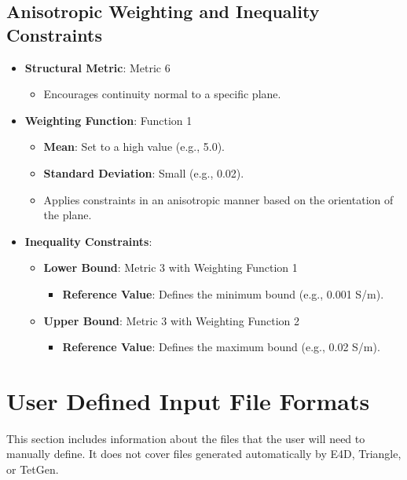 \documentclass[a4paper,12pt]{article}
\begin{document}
\subsection{Anisotropic Weighting and Inequality Constraints}
\begin{itemize}
    \item \textbf{Structural Metric}: Metric 6
    \begin{itemize}
        \item Encourages continuity normal to a specific plane.
    \end{itemize}
    \item \textbf{Weighting Function}: Function 1
    \begin{itemize}
        \item \textbf{Mean}: Set to a high value (e.g., 5.0).
        \item \textbf{Standard Deviation}: Small (e.g., 0.02).
        \item Applies constraints in an anisotropic manner based on the orientation of the plane.
    \end{itemize}
    \item \textbf{Inequality Constraints}:
    \begin{itemize}
        \item \textbf{Lower Bound}: Metric 3 with Weighting Function 1
        \begin{itemize}
            \item \textbf{Reference Value}: Defines the minimum bound (e.g., 0.001 S/m).
        \end{itemize}
        \item \textbf{Upper Bound}: Metric 3 with Weighting Function 2
        \begin{itemize}
            \item \textbf{Reference Value}: Defines the maximum bound (e.g., 0.02 S/m).
        \end{itemize}
    \end{itemize}
\end{itemize}









\section{User Defined Input File Formats}

This section includes information about the files that the user will need to manually define. It does not cover files generated automatically by E4D, Triangle, or TetGen.
\end{document}
